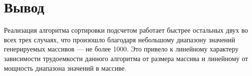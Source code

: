 \section*{Вывод}

Реализация алгоритма сортировки подсчетом работает быстрее остальных двух во всех трех случаях, что произошло благодаря небольшому диапазону значений генерируемых массивов --- не более 1000. Это привело к линейному характеру зависимости трудоемкости данного алгоритма от размера массива и линейному от мощность диапазона значений в массиве.



